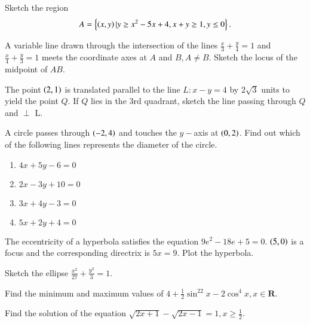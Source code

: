 \documentclass[journal,12pt,onecolumn]{IEEEtran}
\begin{document}
\begin{problem}
Sketch the region
\begin{equation}
A = \left\{\left(x,y\right)\vert y \geq x^2-5x+4, x + y \geq 1, y \leq 0\right\}.
\end{equation}
\end{problem}
\begin{problem}
A variable line drawn through the intersection of the lines $\frac{x}{3} + \frac{y}{4} = 1$ and $\frac{x}{4} + \frac{y}{3} = 1$ meets the coordinate axes at $A$ and $B, A \neq B$.  Sketch the locus of the midpoint of $AB$.
\end{problem}
\solution

\begin{problem}
The point $\left(2,1\right)$ is translated parallel to the line $L:x-y=4$ by $2\sqrt{3}$ units to yield the point $Q$.  If $Q$ lies in the 3rd quadrant, sketch the line passing through $Q$ and $\perp$ L.
\end{problem}
\begin{problem}
A circle passes through $\left(-2,4\right)$ and touches the $y-$axis at $\left(0,2\right)$. Find out which of the following lines represents the diameter of the circle.
\begin{enumerate}
\item $4x+5y-6=0$
\item $2x-3y +10 = 0$
\item $3x+4y-3 = 0$
\item $5x+2y+4 = 0$
\end{enumerate}
\end{problem}
%
\begin{problem}
The eccentricity of a hyperbola satisfies the equation $9e^2-18e+5 = 0$. $\left(5,0\right)$ is a focus and the corresponding directrix is $5x = 9$. Plot the hyperbola.
\end{problem}
%
\solution

\begin{problem}
Sketch the ellipse $\frac{x^2}{27} + \frac{y^2}{3} = 1$.
\end{problem}
\solution

\begin{problem}
Find the minimum and maximum values of $4 + \frac{1}{2}\sin^22x - 2\cos^4 x, x \in \mathbf{R}$. 
\end{problem}
\begin{problem}
Find the solution of the equation $\sqrt{2x+1}- \sqrt{2x-1} = 1, x \geq \frac{1}{2}$.
\end{problem}
\solution

\end{document}

